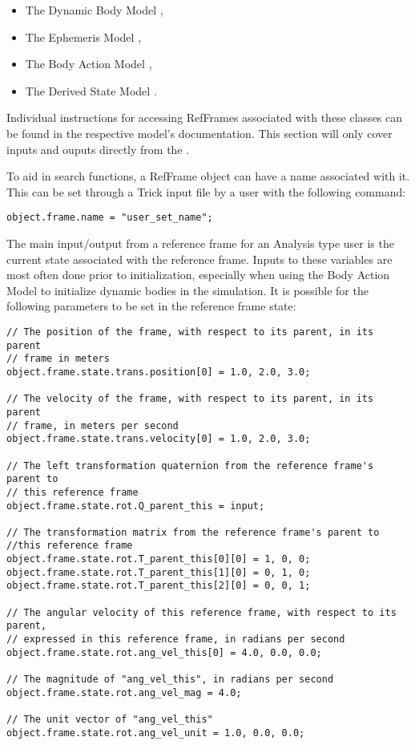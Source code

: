\begin{itemize}
\item{The Dynamic Body Model} \cite{dynenv:DYNBODY},
\item{The Ephemeris Model} \cite{dynenv:EPHEMERIDES},
\item{The Body Action Model} \cite{dynenv:BODYACTION},
\item{The Derived State Model} \cite{dynenv:DERIVEDSTATE}.
\end{itemize}

Individual instructions for accessing RefFrames associated with these
classes can be found in the respective model's documentation. This
section will only cover inputs and ouputs directly
from the .

To aid in search functions, a RefFrame object can have a name associated
with it. This can be set through a Trick input file by a user with
the following command:

\begin{verbatim}
object.frame.name = "user_set_name";
\end{verbatim}

The main input/output from a reference frame for an Analysis type user is
the current state associated with the reference frame. Inputs to these
variables are most often done prior to initialization, especially when using
the Body Action Model \cite{dynenv:BODYACTION} to initialize dynamic bodies
in the simulation. It is possible for the following parameters to be set
in the reference frame state:

\begin{verbatim}
// The position of the frame, with respect to its parent, in its parent
// frame in meters
object.frame.state.trans.position[0] = 1.0, 2.0, 3.0;

// The velocity of the frame, with respect to its parent, in its parent
// frame, in meters per second
object.frame.state.trans.velocity[0] = 1.0, 2.0, 3.0;

// The left transformation quaternion from the reference frame's parent to
// this reference frame
object.frame.state.rot.Q_parent_this = input;

// The transformation matrix from the reference frame's parent to
//this reference frame
object.frame.state.rot.T_parent_this[0][0] = 1, 0, 0;
object.frame.state.rot.T_parent_this[1][0] = 0, 1, 0;
object.frame.state.rot.T_parent_this[2][0] = 0, 0, 1;

// The angular velocity of this reference frame, with respect to its parent,
// expressed in this reference frame, in radians per second
object.frame.state.rot.ang_vel_this[0] = 4.0, 0.0, 0.0;

// The magnitude of "ang_vel_this", in radians per second
object.frame.state.rot.ang_vel_mag = 4.0;

// The unit vector of "ang_vel_this"
object.frame.state.rot.ang_vel_unit = 1.0, 0.0, 0.0;

\end{verbatim}

